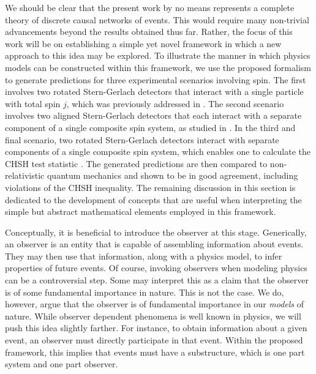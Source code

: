 \documentclass{article}
\begin{document}
We should be clear that the present work by no means represents a complete theory of discrete causal networks of events. This would require many non-trivial advancements beyond the results obtained thus far. Rather, the focus of this work will be on establishing a simple yet novel framework in which a new approach to this idea may be explored. To illustrate the manner in which physics models can be constructed within this framework, we use the proposed formalism to generate predictions for three experimental scenarios involving spin. The first involves two rotated Stern-Gerlach detectors that interact with a single particle with total spin $j$, which was previously addressed in \cite{Powers2023}. The second scenario involves two aligned Stern-Gerlach detectors that each interact with a separate component of a single composite spin system, as studied in \cite{Powers2022}. In the third and final scenario, two rotated Stern-Gerlach detectors interact with separate components of a single composite spin system, which enables one to calculate the CHSH test statistic \cite{Clauser1969}. The generated predictions are then compared to non-relativistic quantum mechanics and shown to be in good agreement, including violations of the CHSH inequality. The remaining discussion in this section is dedicated to the development of concepts that are useful when interpreting the simple but abstract mathematical elements employed in this framework. 

Conceptually, it is beneficial to introduce the observer at this stage. Generically, an observer is an entity that is capable of assembling information about events. They may then use that information, along with a physics model, to infer properties of future events. Of course, invoking observers when modeling physics can be a controversial step. Some may interpret this as a claim that the observer is of some fundamental importance in nature. This is not the case. We do, however, argue that the observer is of fundamental importance in our \textit{models} of nature. While observer dependent phenomena is well known in physics, we will push this idea slightly farther. For instance, to obtain information about a given event, an observer must directly participate in that event. Within the proposed framework, this implies that events must have a substructure, which is one part system and one part observer. 
\end{document}
